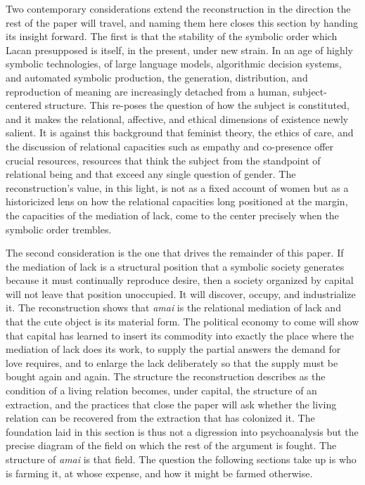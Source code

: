 \documentclass[11pt,a4paper]{article}
\begin{document}
Two contemporary considerations extend the reconstruction in the direction the rest of the paper will travel, and naming them here closes this section by handing its insight forward. The first is that the stability of the symbolic order which Lacan presupposed is itself, in the present, under new strain. In an age of highly symbolic technologies, of large language models, algorithmic decision systems, and automated symbolic production, the generation, distribution, and reproduction of meaning are increasingly detached from a human, subject-centered structure. This re-poses the question of how the subject is constituted, and it makes the relational, affective, and ethical dimensions of existence newly salient. It is against this background that feminist theory, the ethics of care, and the discussion of relational capacities such as empathy and co-presence offer crucial resources, resources that think the subject from the standpoint of relational being and that exceed any single question of gender. The reconstruction's value, in this light, is not as a fixed account of women but as a historicized lens on how the relational capacities long positioned at the margin, the capacities of the mediation of lack, come to the center precisely when the symbolic order trembles.

The second consideration is the one that drives the remainder of this paper. If the mediation of lack is a structural position that a symbolic society generates because it must continually reproduce desire, then a society organized by capital will not leave that position unoccupied. It will discover, occupy, and industrialize it. The reconstruction shows that \textit{amai} is the relational mediation of lack and that the cute object is its material form. The political economy to come will show that capital has learned to insert its commodity into exactly the place where the mediation of lack does its work, to supply the partial answers the demand for love requires, and to enlarge the lack deliberately so that the supply must be bought again and again. The structure the reconstruction describes as the condition of a living relation becomes, under capital, the structure of an extraction, and the practices that close the paper will ask whether the living relation can be recovered from the extraction that has colonized it. The foundation laid in this section is thus not a digression into psychoanalysis but the precise diagram of the field on which the rest of the argument is fought. The structure of \textit{amai} is that field. The question the following sections take up is who is farming it, at whose expense, and how it might be farmed otherwise.
\end{document}
